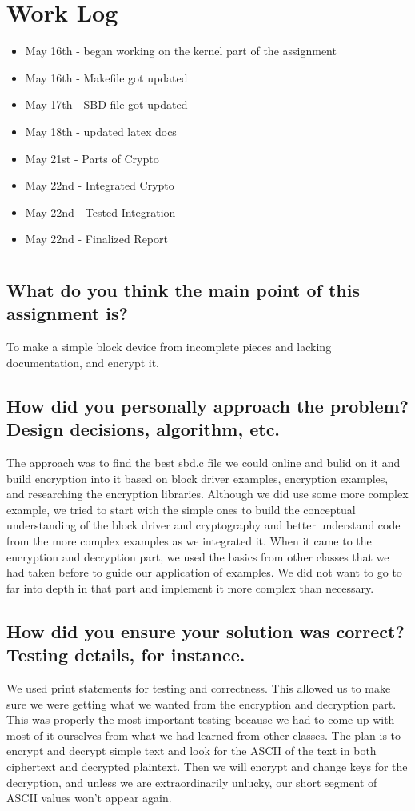 \documentclass[draftclsnofoot,onecolumn,10pt,compsoc]{IEEEtran}
\begin{document}
\section{Work Log}
\begin{itemize}
	\item May 16th - began working on the kernel part of the assignment
	\item May 16th - Makefile got updated
	\item May 17th - SBD file got updated
	\item May 18th - updated latex docs
	\item May 21st - Parts of Crypto
	\item May 22nd - Integrated Crypto
	\item May 22nd - Tested Integration
	\item May 22nd - Finalized Report
	
	
	
	
	
\end{itemize}
\section{}
\subsection{What do you think the main point of this assignment is?}
To make a simple block device from incomplete pieces and lacking documentation, and encrypt it.  
\subsection{How did you personally approach the problem? Design decisions, algorithm, etc.}
The approach was to find the best sbd.c file we could online and bulid on it and build encryption into it based on block driver examples, encryption examples, and researching the encryption libraries. Although we did use some more complex example, we tried to start with the simple ones to build the conceptual understanding of the block driver and cryptography and better understand code from the more complex examples as we integrated it.  When it came to the encryption and decryption part, we used the basics from other classes that we had taken before to guide our application of examples. We did not want to go to far into depth in that part and implement it more complex than necessary.   
\subsection{How did you ensure your solution was correct? Testing details, for instance.}
We used print statements for testing and correctness.  This allowed us to make sure we were getting what we wanted from the encryption and decryption part. This was properly the most important testing because we had to come up with most of it ourselves from what we had learned from other classes. The plan is to encrypt and decrypt simple text and look for the ASCII of the text in both ciphertext and decrypted plaintext. Then we will encrypt and change keys for the decryption, and unless we are extraordinarily unlucky, our short segment of ASCII values won't appear again.
\end{document}
